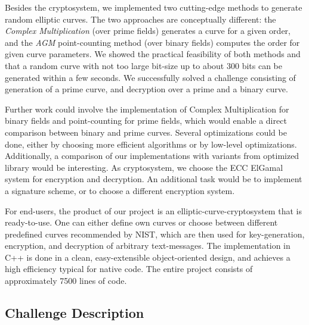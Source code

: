\documentclass[11pt,english]{article}
\begin{document}
Besides the cryptosystem, we implemented two cutting-edge methods to generate random elliptic curves. The two approaches are conceptually different: the \emph{Complex Multiplication} (over prime fields) generates a curve for a given order, and the \emph{AGM} point-counting method (over binary fields) computes the order for given curve parameters. We showed the practical feasibility of both methods and that a random curve with not too large bit-size up to about 300 bits can be generated within a few seconds. We successfully solved a challenge consisting of generation of a prime curve, and decryption over a prime and a binary curve. 

Further work could involve the implementation of Complex Multiplication for binary fields and point-counting for prime fields, which would enable a direct comparison between binary and prime curves. Several optimizations could be done, either by choosing more efficient algorithms or by low-level optimizations. Additionally, a comparison of our implementations with variants from optimized library would be interesting. As cryptosystem, we choose the ECC ElGamal system for encryption and decryption. An additional task would be to implement a signature scheme, or to choose a different encryption system.

For end-users, the product of our project is an elliptic-curve-cryptosystem that is ready-to-use. One can either define own curves or choose between different predefined curves recommended by NIST, which are then used for key-generation, encryption, and decryption of arbitrary text-messages. The implementation in C++ is done in a clean, easy-extensible object-oriented design, and achieves a high efficiency typical for native code. The entire project consists of approximately 7500 lines of code.

\begin{appendix}
\section{Challenge Description}
\label{appendixa}

\end{appendix}

\newpage


\end{document}
